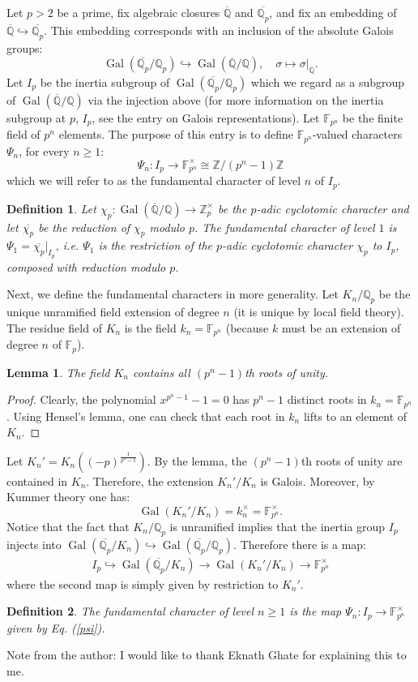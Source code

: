 \documentclass[12pt]{article}
\newtheorem{defn}{Definition}
\newtheorem{lemma}{Lemma}
\theoremstyle{definition}
\newcommand{\Ints}{\mathbb{Z}}
\newcommand{\Rats}{\mathbb{Q}}
\newcommand{\Gal}{\operatorname{Gal}}
\newcommand{\F}{\mathbb{F}}
\begin{document}
Let $p>2$ be a prime, fix algebraic closures $\overline{\Rats}$ and $\overline{\Rats_p}$, and fix an embedding of $\overline{\Rats}\hookrightarrow \overline{\Rats_p}$. This embedding corresponds with an inclusion of the absolute Galois groups:
$$\Gal(\overline{\Rats_p}/\Rats_p)\hookrightarrow \Gal(\overline{\Rats}/\Rats), \quad \sigma \mapsto \sigma|_{\overline{\Rats}}.$$
Let $I_p$ be the inertia subgroup of $\Gal(\overline{\Rats_p}/\Rats_p)$ which we regard as a subgroup of $\Gal(\overline{\Rats}/\Rats)$ via the injection above (for more information on the inertia subgroup at $p$, $I_p$, see the entry on Galois representations). Let $\F_{p^n}$ be the finite field of $p^n$ elements. The purpose of this entry is to define $\F_{p^n}$-valued characters $\Psi_n$, for every $n\geq 1$:
$$\Psi_n : I_p \longrightarrow \F_{p^n}^\times \cong \Ints/(p^n-1)\Ints$$
which we will refer to as the fundamental character of level $n$ of $I_p$.

\begin{defn}
Let $\chi_p:\Gal(\overline{\Rats}/\Rats)\to \Ints_p^\times$ be the $p$-adic cyclotomic character and let $\overline{\chi_p}$ be the reduction of $\chi_p$ modulo $p$. The fundamental character of level $1$ is $\Psi_1=\overline{\chi_p}|_{I_p}$, i.e. $\Psi_1$ is the restriction of the $p$-adic cyclotomic character $\chi_p$ to $I_p$, composed with reduction modulo $p$.
\end{defn}

Next, we define the fundamental characters in more generality. Let $K_n/\Rats_p$ be the unique unramified field extension of degree $n$ (it is unique by local field theory). The residue field of $K_n$ is the field $k_n=\F_{p^n}$ (because $k$ must be an extension of degree $n$ of $\F_p$).

\begin{lemma}
The field $K_n$ contains all $(p^n-1)$th roots of unity.
\end{lemma}
\begin{proof}
Clearly, the polynomial $x^{p^n-1}-1=0$ has $p^n-1$ distinct roots in $k_n=\F_{p^n}$. Using Hensel's lemma, one can check that each root in $k_n$ lifts to an element of $K_n$.
\end{proof}

Let $K_n'=K_n((-p)^{\frac{1}{p^n-1}})$. By the lemma, the $(p^n-1)$th roots of unity are contained in $K_n$. Therefore, the extension $K_n'/K_n$ is Galois. Moreover, by Kummer theory one has:
$$\Gal(K_n'/K_n)=k_n^\times=\F_{p^n}^\times.$$
Notice that the fact that $K_n/\Rats_p$ is unramified implies that the inertia group $I_p$ injects into $\Gal(\overline{\Rats_p}/K_n)\hookrightarrow \Gal(\overline{\Rats_p}/\Rats_p)$. Therefore there is a map:
\begin{eqnarray} 
\label{psi} I_p \hookrightarrow \Gal(\overline{\Rats_p}/K_n)\to \Gal(K_n'/K_n) \to \F_{p^n}^\times
\end{eqnarray}
where the second map is simply given by restriction to $K_n'$.

\begin{defn}
The fundamental character of level $n\geq 1$ is the map $\Psi_n : I_p \to \F_{p^n}^\times$ given by Eq. (\ref{psi}).
\end{defn}

Note from the author: I would like to thank Eknath Ghate for explaining this to me.
\end{document}
